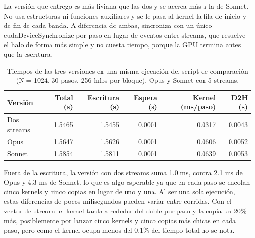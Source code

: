 La versión que entrego es más liviana que las dos y se acerca más a la de Sonnet. No usa estructuras ni funciones auxiliares y se le pasa al kernel la fila de inicio y de fin de cada banda. A diferencia de ambas, sincroniza con un único cudaDeviceSynchronize por paso en lugar de eventos entre streams, que resuelve el halo de forma más simple y no cuesta tiempo, porque la GPU termina antes que la escritura.

\begin{table}[H]
  \centering
  \begin{tabular}{lrrrrr}
    \toprule
    Versión & Total (s) & Escritura (s) & Espera (s) & Kernel (ms/paso) & D2H (s) \\
    \midrule
    Dos streams & 1.5465 & 1.5455 & 0.0001 & 0.0317 & 0.0043 \\
    Opus        & 1.5647 & 1.5626 & 0.0001 & 0.0606 & 0.0052 \\
    Sonnet      & 1.5854 & 1.5811 & 0.0001 & 0.0639 & 0.0053 \\
    \bottomrule
  \end{tabular}
  \caption{Tiempos de las tres versiones en una misma ejecución del script de comparación (N = 1024, 30 pasos, 256 hilos por bloque). Opus y Sonnet con 5 streams.}
  \label{tab:ia_tiempos}
\end{table}

Fuera de la escritura, la versión con dos streams suma 1.0 ms, contra 2.1 ms de Opus y 4.3 ms de Sonnet, lo que es algo esperable ya que en cada paso se encolan cinco kernels y cinco copias en lugar de uno y una. Al ser una sola ejecución, estas diferencias de pocos milisegundos pueden variar entre corridas. Con el vector de streams el kernel tarda alrededor del doble por paso y la copia un 20\% más, posiblemente por lanzar cinco kernels y cinco copias más chicas en cada paso, pero como el kernel ocupa menos del 0.1\% del tiempo total no se nota.

